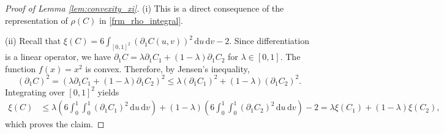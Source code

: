 \documentclass{article}
\theoremstyle{plain}
\theoremstyle{definition}
\newcommand{\de}{\mathrm{\,d}}
\begin{document}
\begin{proof}[Proof of Lemma \ref{lem:convexity_xi}]
    (i) This is a direct consequence of the representation of \(\rho(C)\) in \eqref{frm_rho_integral}.

    (ii) Recall that \(\xi(C) = 6 \int_{[0,1]^2} (\partial_1 C(u,v))^2 \de u \de v - 2\). Since differentiation is a linear operator, we have \(\partial_1 C = \lambda \partial_1 C_1 + (1-\lambda) \partial_1 C_2\) for $\lambda\in[0,1]$.
    The function \(f(x) = x^2\) is convex. Therefore, by Jensen's inequality,
    \[
        (\partial_1 C)^2 = (\lambda \partial_1 C_1 + (1-\lambda) \partial_1 C_2)^2 \le \lambda (\partial_1 C_1)^2 + (1-\lambda) (\partial_1 C_2)^2.
    \]
    Integrating over \([0,1]^2\) yields
    \begin{align*}
        \xi(C)
        &\le \lambda \left(6 \int_0^1\int_0^1 (\partial_1 C_1)^2 \de u \de v\right) + (1-\lambda) \left(6 \int_0^1\int_0^1 (\partial_1 C_2)^2 \de u \de v\right) - 2 
        = \lambda \xi(C_1) + (1-\lambda) \xi(C_2),
    \end{align*}
    which proves the claim.
\end{proof}
\end{document}
